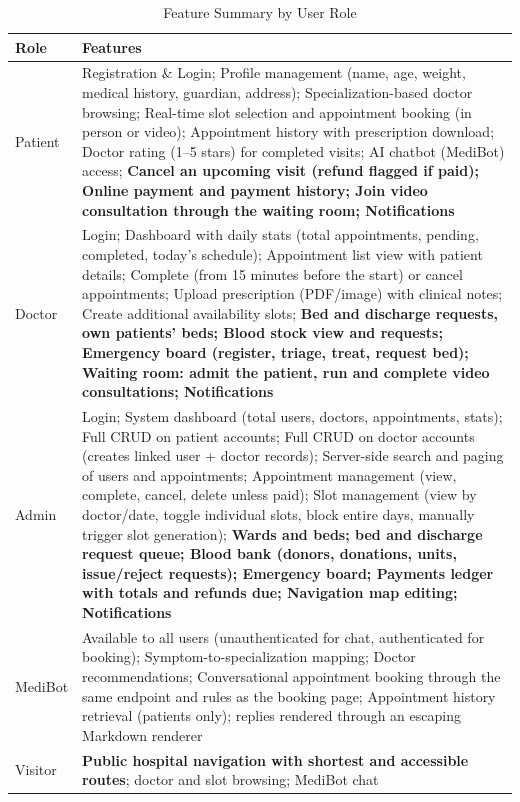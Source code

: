 \begin{table}[H]
\centering
\caption{Feature Summary by User Role}
\label{tab:features}
\begin{tabular}{|L{2cm}|L{11.5cm}|}
\hline
\textbf{Role} & \textbf{Features} \\
\hline
Patient & Registration \& Login; Profile management (name, age, weight, medical history, guardian, address); Specialization-based doctor browsing; Real-time slot selection and appointment booking (in person or video); Appointment history with prescription download; Doctor rating (1--5 stars) for completed visits; AI chatbot (MediBot) access; \textbf{Cancel an upcoming visit (refund flagged if paid); Online payment and payment history; Join video consultation through the waiting room; Notifications} \\
\hline
Doctor & Login; Dashboard with daily stats (total appointments, pending, completed, today's schedule); Appointment list view with patient details; Complete (from 15 minutes before the start) or cancel appointments; Upload prescription (PDF/image) with clinical notes; Create additional availability slots; \textbf{Bed and discharge requests, own patients' beds; Blood stock view and requests; Emergency board (register, triage, treat, request bed); Waiting room: admit the patient, run and complete video consultations; Notifications} \\
\hline
Admin & Login; System dashboard (total users, doctors, appointments, stats); Full CRUD on patient accounts; Full CRUD on doctor accounts (creates linked user + doctor records); Server-side search and paging of users and appointments; Appointment management (view, complete, cancel, delete unless paid); Slot management (view by doctor/date, toggle individual slots, block entire days, manually trigger slot generation); \textbf{Wards and beds; bed and discharge request queue; Blood bank (donors, donations, units, issue/reject requests); Emergency board; Payments ledger with totals and refunds due; Navigation map editing; Notifications} \\
\hline
MediBot & Available to all users (unauthenticated for chat, authenticated for booking); Symptom-to-specialization mapping; Doctor recommendations; Conversational appointment booking through the same endpoint and rules as the booking page; Appointment history retrieval (patients only); replies rendered through an escaping Markdown renderer \\
\hline
Visitor & \textbf{Public hospital navigation with shortest and accessible routes}; doctor and slot browsing; MediBot chat \\
\hline
\end{tabular}
\end{table}
